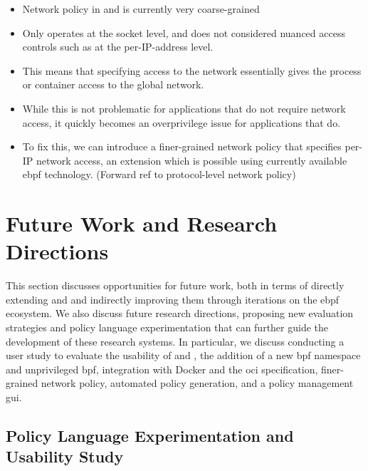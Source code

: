 \begin{inprogress}
  \begin{itemize}
    \item Network policy in \bpfbox{} and \bpfcontain{} is currently very coarse-grained
    \item Only operates at the socket level, and does not considered nuanced access
    controls such as at the per-IP-address level.
    \item This means that specifying access to the network essentially gives the process or container
    access to the global network.
    \item While this is not problematic for applications that do not require network access,
    it quickly becomes an overprivilege issue for applications that do.
    \item To fix this, we can introduce a finer-grained network policy that specifies per-IP network access, an extension which
    is possible using currently available \gls{ebpf} technology. (Forward ref to protocol-level network policy)
  \end{itemize}
\end{inprogress}


\section{Future Work and Research Directions}%
\label{s:disc-future-work}

This section discusses opportunities for future work, both in terms of directly extending
\bpfbox{} and \bpfcontain{} and indirectly improving them through iterations on the
\gls{ebpf} ecosystem. We also discuss future research directions, proposing new evaluation
strategies and policy language experimentation that can further guide the development of
these research systems. In particular, we discuss conducting a user study to evaluate the
usability of \bpfbox{} and \bpfcontain{}, the addition of a new \gls{bpf} namespace and
unprivileged \gls{bpf}, integration with Docker and the \gls{oci} specification,
finer-grained network policy, automated policy generation, and a policy management \gls{gui}.

\subsection{Policy Language Experimentation and Usability Study}

